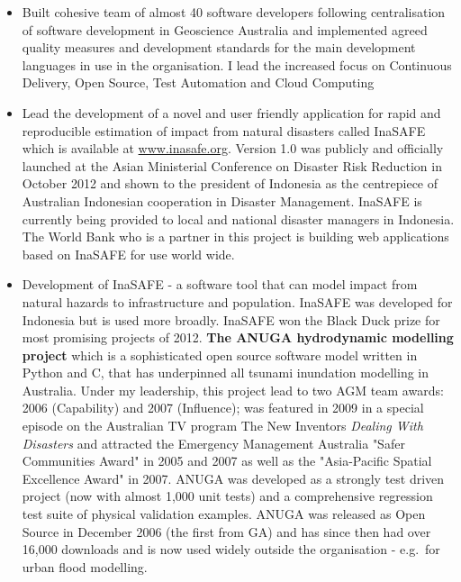 \documentclass[11pt,a4paper]{article}
\begin{document}
\begin{itemize}
  \item Built cohesive team of almost 40 software developers following centralisation of software development in Geoscience Australia and implemented agreed quality measures and development standards for the main development languages in use in the organisation. I lead the increased focus on Continuous Delivery, Open Source, Test Automation and Cloud Computing
  \item Lead the development of a novel and user friendly application for rapid and reproducible estimation of impact from natural disasters called InaSAFE which is available at \url{www.inasafe.org}.
  Version 1.0 was publicly and officially launched at the Asian Ministerial Conference on Disaster Risk Reduction in October 2012 and shown to the president of Indonesia as the centrepiece of Australian Indonesian cooperation in Disaster Management. InaSAFE is currently being provided to local and national disaster managers in Indonesia. The World Bank who is a partner in this project is building web applications based on InaSAFE for use world wide.
  \item Development of InaSAFE - a software tool that can model impact from natural hazards to infrastructure and population. InaSAFE was developed for Indonesia but is used more broadly. InaSAFE won the Black Duck prize for most promising projects of 2012. %
  \noindent \textbf{The ANUGA hydrodynamic modelling project} which is a sophisticated open source software model written in Python and C, that has underpinned all tsunami inundation modelling in Australia. Under my leadership, this project lead to two AGM team awards: 2006 (Capability) and 2007 (Influence); was featured in 2009 in a special episode on the Australian TV program The New Inventors \emph{Dealing With Disasters} and attracted the Emergency Management Australia "Safer Communities Award" in 2005 and 2007 as well as the "Asia-Pacific Spatial Excellence Award" in 2007. ANUGA was developed as a strongly test driven project (now with almost 1,000 unit tests) and a comprehensive regression test suite of physical validation examples. ANUGA was released as Open Source in December 2006 (the first from GA) and has since then had over 16,000 downloads and is now used widely outside the organisation - e.g.\ for urban flood modelling.\\

\end{itemize}
\end{document}
